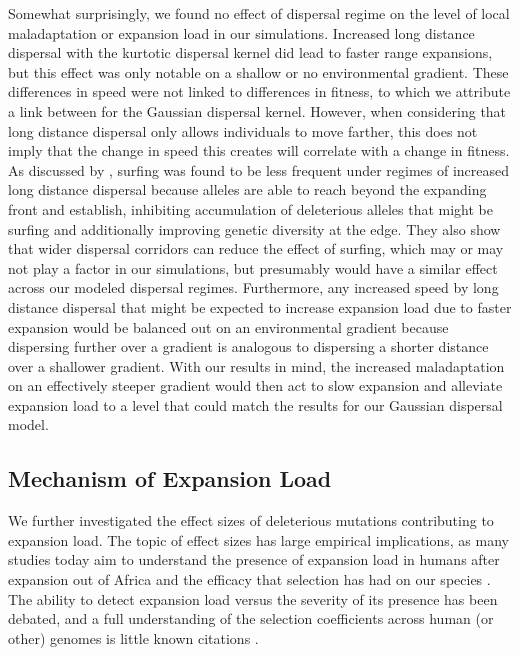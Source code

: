 Somewhat surprisingly, we found no effect of dispersal regime on the level of local maladaptation or expansion load in our simulations. Increased long distance dispersal with the kurtotic dispersal kernel did lead to faster range expansions, but this effect was only notable on a shallow or no environmental gradient. These differences in speed were not linked to differences in fitness, to which we attribute a link between for the Gaussian dispersal kernel. However, when considering that long distance dispersal only allows individuals to move farther, this does not imply that the change in speed this creates will correlate with a change in fitness. As discussed by \citet{Fayard:2009}, surfing was found to be less frequent under regimes of increased long distance dispersal because alleles are able to reach beyond the expanding front and establish, inhibiting accumulation of deleterious alleles that might be surfing and additionally improving genetic diversity at the edge. They also show that wider dispersal corridors can reduce the effect of surfing, which may or may not play a factor in our simulations, but presumably would have a similar effect across our modeled dispersal regimes. Furthermore, any increased speed by long distance dispersal that might be expected to increase expansion load due to faster expansion would be balanced out on an environmental gradient because dispersing further over a gradient is analogous to dispersing a shorter distance over a shallower gradient. With our results in mind, the increased maladaptation on an effectively steeper gradient would then act to slow expansion and alleviate expansion load to a level that could match the results for our Gaussian dispersal model.



\subsection*{Mechanism of Expansion Load}
We further investigated the effect sizes of deleterious mutations contributing to expansion load. The topic of effect sizes has large empirical implications, as many studies today aim to understand the presence of expansion load in humans after expansion out of Africa and the efficacy that selection has had on our species \citep{Henn:2015,Henn:2015b, Lohmueller:2014, Lohmueller:2014b, Gravel:2016}. The ability to detect expansion load versus the severity of its presence has been debated, and a full understanding of the selection coefficients across human (or other) genomes is little known \color{red}citations \color{black}.

